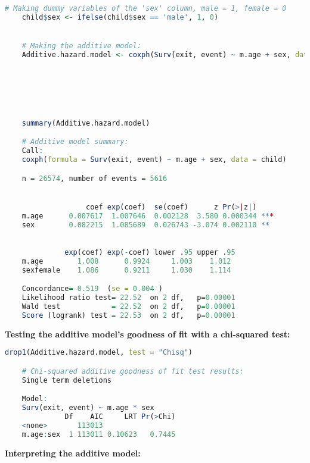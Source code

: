 \documentclass[12pt,letterpaper]{article}
\begin{document}
    \begin{lstlisting}[language = R]
    # Making dummy variables of the 'sex' column, male = 1, female = 0
    child$sex <- ifelse(child$sex == 'male', 1, 0)


    # Making the additive model:
    Additive.hazard.model <- coxph(Surv(exit, event) ~ m.age + sex, data = child)






    summary(Additive.hazard.model)

    # Additive model summary:
    Call:
    coxph(formula = Surv(exit, event) ~ m.age + sex, data = child)

    n = 26574, number of events = 5616 


                   coef exp(coef)  se(coef)      z Pr(>|z|)
    m.age      0.007617  1.007646  0.002128  3.580 0.000344 ***
    sex        0.082215  1.085689  0.026743 -3.074 0.002110 **
    

              exp(coef) exp(-coef) lower .95 upper .95
    m.age        1.008      0.9924     1.003    1.012
    sexfemale    1.086      0.9211     1.030    1.114

    Concordance= 0.519  (se = 0.004 )
    Likelihood ratio test= 22.52  on 2 df,   p=0.00001
    Wald test            = 22.52  on 2 df,   p=0.00001
    Score (logrank) test = 22.53  on 2 df,   p=0.00001\end{lstlisting}

\vspace{.45cm}

\textbf{Testing the additive model's goodness of fit with a chi-squared test:}

\vspace{.2cm} 

    \begin{lstlisting}[language = R]
    drop1(Additive.hazard.model, test = "Chisq")

    # Chi-squared additive goodness of fit test results:
    Single term deletions

    Model:
    Surv(exit, event) ~ m.age * sex
              Df    AIC     LRT Pr(>Chi)
    <none>       113013                 
    m.age:sex  1 113011 0.10623   0.7445\end{lstlisting}

\vspace{.45cm}

\textbf{Interpreting the additive model:}

\vspace{.2cm} 
\end{document}
